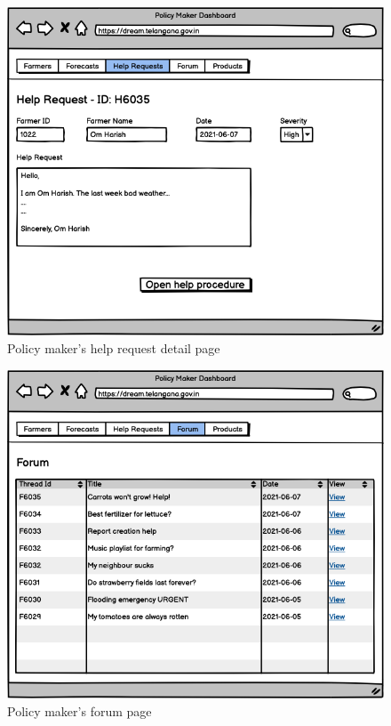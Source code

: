 \documentclass[10pt]{article} %
\begin{document}
\begin{figure}[h]
    \centering
    \includegraphics[scale=0.4]{images/uimockups/pm_helprequestdetail.png}
    \caption{Policy maker's help request detail page}
    \label{fig:ui_pm_helprequestdetail}
\end{figure}
\begin{figure}[h]
    \centering
    \includegraphics[scale=0.4]{images/uimockups/pm_forum.png}
    \caption{Policy maker's forum page}
    \label{fig:ui_pm_forum}
\end{figure}
\end{document}
